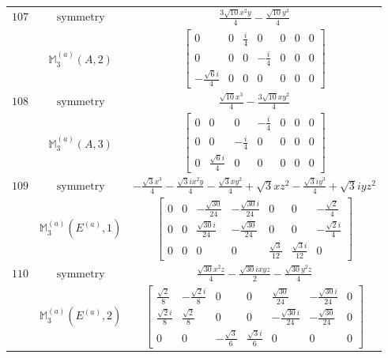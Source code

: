 \documentclass[fleqn,8pt,landscape]{jsarticle}
\begin{document}
\begin{longtable}{ccc}
$ 107 $ & $ \text{symmetry} $ & $ \frac{3 \sqrt{10} x^{2} y}{4} - \frac{\sqrt{10} y^{3}}{4} $ \\
$  $ & $ \mathbb{M}_{3}^{(a)}(A,2) $ & $ \begin{bmatrix} 0 & 0 & \frac{i}{4} & 0 & 0 & 0 & 0 \\ 0 & 0 & 0 & - \frac{i}{4} & 0 & 0 & 0 \\ - \frac{\sqrt{6} i}{4} & 0 & 0 & 0 & 0 & 0 & 0 \end{bmatrix} $ \\ \hline
$ 108 $ & $ \text{symmetry} $ & $ \frac{\sqrt{10} x^{3}}{4} - \frac{3 \sqrt{10} x y^{2}}{4} $ \\
$  $ & $ \mathbb{M}_{3}^{(a)}(A,3) $ & $ \begin{bmatrix} 0 & 0 & 0 & - \frac{i}{4} & 0 & 0 & 0 \\ 0 & 0 & - \frac{i}{4} & 0 & 0 & 0 & 0 \\ 0 & \frac{\sqrt{6} i}{4} & 0 & 0 & 0 & 0 & 0 \end{bmatrix} $ \\ \hline
$ 109 $ & $ \text{symmetry} $ & $ - \frac{\sqrt{3} x^{3}}{4} - \frac{\sqrt{3} i x^{2} y}{4} - \frac{\sqrt{3} x y^{2}}{4} + \sqrt{3} x z^{2} - \frac{\sqrt{3} i y^{3}}{4} + \sqrt{3} i y z^{2} $ \\
$  $ & $ \mathbb{M}_{3}^{(a)}(E^{(a)},1) $ & $ \begin{bmatrix} 0 & 0 & - \frac{\sqrt{30}}{24} & - \frac{\sqrt{30} i}{24} & 0 & 0 & - \frac{\sqrt{2}}{4} \\ 0 & 0 & \frac{\sqrt{30} i}{24} & - \frac{\sqrt{30}}{24} & 0 & 0 & - \frac{\sqrt{2} i}{4} \\ 0 & 0 & 0 & 0 & \frac{\sqrt{3}}{12} & \frac{\sqrt{3} i}{12} & 0 \end{bmatrix} $ \\ \hline
$ 110 $ & $ \text{symmetry} $ & $ \frac{\sqrt{30} x^{2} z}{4} - \frac{\sqrt{30} i x y z}{2} - \frac{\sqrt{30} y^{2} z}{4} $ \\
$  $ & $ \mathbb{M}_{3}^{(a)}(E^{(a)},2) $ & $ \begin{bmatrix} \frac{\sqrt{2}}{8} & - \frac{\sqrt{2} i}{8} & 0 & 0 & \frac{\sqrt{30}}{24} & - \frac{\sqrt{30} i}{24} & 0 \\ \frac{\sqrt{2} i}{8} & \frac{\sqrt{2}}{8} & 0 & 0 & - \frac{\sqrt{30} i}{24} & - \frac{\sqrt{30}}{24} & 0 \\ 0 & 0 & - \frac{\sqrt{3}}{6} & \frac{\sqrt{3} i}{6} & 0 & 0 & 0 \end{bmatrix} $ \\ \hline

\end{longtable}
\end{document}
